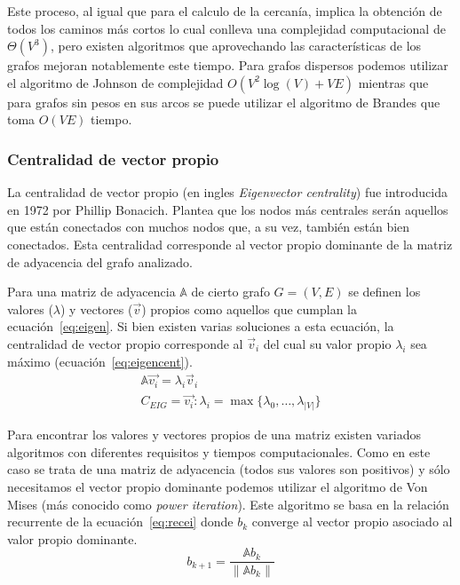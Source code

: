 Este proceso, al igual que para el calculo de la cercanía, implica la obtención
de todos los caminos más cortos lo cual conlleva una complejidad computacional
de $\Theta (V^3)$, pero existen algoritmos que aprovechando las características
de los grafos mejoran notablemente este tiempo. Para grafos dispersos podemos
utilizar el algoritmo de Johnson\cite{johnson1977efficient} de complejidad 
$O(V^2\log (V) + VE)$ mientras que para grafos sin pesos en sus arcos se puede
utilizar el algoritmo de Brandes\cite{brandes2001faster} que toma $O(VE)$
tiempo.

\subsubsection{Centralidad de vector propio}
La centralidad de vector propio (en ingles \emph{Eigenvector centrality}) fue
introducida en 1972 por Phillip Bonacich\cite{bonacich1972factoring}.
Plantea que los nodos más centrales serán aquellos que están conectados con
muchos nodos que, a su vez, también están bien conectados.
Esta centralidad corresponde al vector propio dominante de la matriz de
adyacencia del grafo analizado. 

Para una matriz de adyacencia $\mathbb{A}$ de cierto grafo $G=(V,E)$ se definen 
los valores ($\lambda$) y vectores ($\vec{v}$) propios como aquellos que 
cumplan la ecuación~\ref{eq:eigen}.
Si bien existen varias soluciones a esta ecuación, la centralidad de vector
propio corresponde al $\vec{v}_i$ del cual su valor propio $\lambda_i$ sea
máximo (ecuación~\ref{eq:eigencent}). 
\begin{gather}
  \label{eq:eigen}
  \mathbb{A}\vec{v_i} = \lambda_i\vec{v}_i \\
  \label{eq:eigencent}
  C_{EIG} = \vec{v_i} : \lambda_i = \max{\{\lambda_0,\dots,\lambda_{|V|}\}}
\end{gather}

Para encontrar los valores y vectores propios de una matriz existen variados
algoritmos con diferentes requisitos y tiempos computacionales. Como en este
caso se trata de una matriz de adyacencia (todos sus valores son positivos) y
sólo necesitamos el vector propio dominante podemos utilizar el algoritmo de
Von Mises\cite{mises1929praktische} (más conocido como \emph{power iteration}).
Este algoritmo se basa en la relación recurrente de la ecuación~\ref{eq:recei}
donde $b_k$ converge al vector propio asociado al valor propio dominante.
\begin{equation}
  \label{eq:recei}
  b_{k+1} = \frac{\mathbb{A}b_k}{\lVert\mathbb{A}b_k\rVert}
\end{equation}

